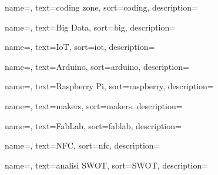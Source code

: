 {
	name=,
    text=coding zone,
    sort=coding,
    description={}
}

{
	name=,
    text=Big Data,
    sort=big,
    description={}
}

{
	name=,
    text=IoT,
    sort=iot,
    description={}
}

{
	name=,
    text=Arduino,
    sort=arduino,
    description={}
}

{
	name=,
    text=Raspberry Pi,
    sort=raspberry,
    description={}
}

{
	name=,
    text=makers,
    sort=makers,
    description={}
}

{
	name=,
    text=FabLab,
    sort=fablab,
    description={}
}

{
	name=,
    text=NFC,
    sort=nfc,
    description={}
}

{
	name=,
    text=analisi SWOT,
    sort=SWOT,
    description={}
}


